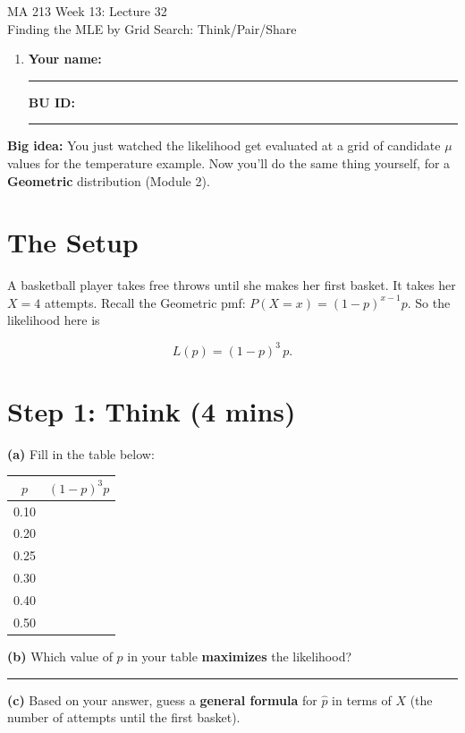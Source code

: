 \documentclass{article}
\newcommand{\coursenumber}{MA 213}
\newcommand{\weekplaceholder}{13}
\newcommand{\lectureplaceholder}{32}
\newcommand{\lecturetitle}{Finding the MLE by Grid Search: Think/Pair/Share}
\newcommand{\nameblank}{\rule{1.75in}{0.4pt}}
\newcommand{\idblank}{\rule{1.55in}{0.4pt}}
\newcommand{\shortblank}{\rule{1in}{0.4pt}}
\begin{document}
\begin{center}
  {\LARGE \coursenumber{} Week \weekplaceholder{}: Lecture \lectureplaceholder{}}\\
  {\large \lecturetitle{}}
\end{center}

\begin{enumerate}[label=\arabic*.,leftmargin=*,itemsep=.7em]
  \item \textbf{Your name:} \nameblank \hfill \textbf{BU ID:} \idblank
\end{enumerate}

\textbf{Big idea:} You just watched the likelihood get evaluated at a grid of candidate $\mu$ values for the temperature example. Now you'll do the same thing yourself, for a \textbf{Geometric} distribution (Module 2).

\section*{The Setup}

A basketball player takes free throws until she makes her first basket. It takes her $X=4$ attempts. Recall the Geometric pmf: $P(X=x) = (1-p)^{x-1}p$. So the likelihood here is

\[
L(p) = (1-p)^{3}\,p.
\]

\section*{Step 1: Think (4 mins)}

\textbf{(a)} Fill in the table below:

\begin{center}
\renewcommand{\arraystretch}{1.5}
\begin{tabular}{c c}
\toprule
$p$ & $(1-p)^3 p$ \\
\midrule
0.10 & \\
0.20 & \\
0.25 & \\
0.30 & \\
0.40 & \\
0.50 & \\
\bottomrule
\end{tabular}
\end{center}

\textbf{(b)} Which value of $p$ in your table \textbf{maximizes} the likelihood? \shortblank

\textbf{(c)} Based on your answer, guess a \textbf{general formula} for $\hat{p}$ in terms of $X$ (the number of attempts until the first basket).
\vspace{0.3in}
\end{document}

